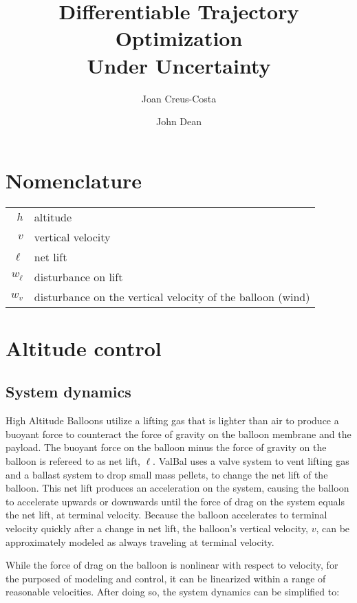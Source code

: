 \documentclass[11pt]{scrartcl} %
\title{\bfseries Differentiable Trajectory Optimization\\ Under Uncertainty}
\author{Joan Creus-Costa\and John Dean}
\begin{document}
\maketitle

\def\States{\mathcal{S}}
\def\Altitudes{\mathcal{H}}
\def\Velocities{\mathcal{V}}
\def\Lifts{\mathcal{L}}
\newcommand{\mx}[2]{\left[ \begin{array}{#1} #2 \end{array} \right]}

\tableofcontents

\section*{Nomenclature}
\begin{tabular}{rl}
$h$ & altitude  \\
$v$ & vertical velocity\\
$\ell$ & net lift \\
$w_{\dot \ell}$ & disturbance on lift \\
$w_{v}$ & disturbance on the vertical velocity of the balloon (wind) \\
\end{tabular}

\section{Altitude control}
\subsection{System dynamics}

High Altitude Balloons utilize a lifting gas that is lighter than air to produce a buoyant force to counteract the force of gravity on the balloon membrane and the payload. The buoyant force on the balloon minus the force of gravity on the balloon is refereed to as net lift, $\ell$. ValBal uses a valve system to vent lifting gas and a ballast system to drop small mass pellets, to change the net lift of the balloon. This net lift produces an acceleration on the system, causing the balloon to accelerate upwards or downwards until the force of drag on the system equals the net lift, at terminal velocity. Because the balloon accelerates to terminal velocity quickly after a change in net lift, the balloon's vertical velocity, $v$, can be approximately modeled as always traveling at terminal velocity.

While the force of drag on the balloon is nonlinear with respect to velocity, for the purposed of modeling and control, it can be linearized within a range of reasonable velocities. After doing so, the system dynamics can be simplified to:
\end{document}
